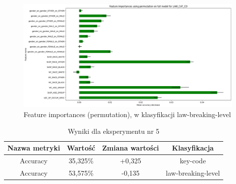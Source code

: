 \documentclass{classrep}
\begin{document}
{{{{                    \begin{figure}[!htbp]
                        \centering
                        \includegraphics[width=\textwidth]{img/5.1.3/5/Feature importances using permutation on full model for LAW_CAT_CD.png}
                        \caption{Feature importances (permutation), w klasyfikacji law-breaking-level}
                        \label{goal_1_exp_5_imp_perm_law}
                    \end{figure}
                    
                    \begin{table}
                    \centering
                     \begin{tabular}{|c|c|c|c|}
                            \hline
                          Nazwa metryki & Wartość & Zmiana wartości & Klasyfikacja \\ \hline
                            Accuracy &  35,325\% & +0,325 & key-code\\ \hline
                            Accuracy &  53,575\% & -0,135 & law-breaking-level\\ \hline
                        \end{tabular}
                        \caption{Wyniki dla eksperymentu nr 5}
                        \label{goal_1_exp_5_results}
                     \end{table}
                     \FloatBarrier
                }
            
}}}
\end{document}
